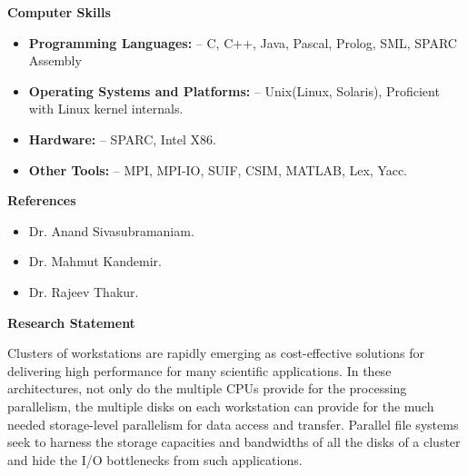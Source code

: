 \documentclass{article}
\begin{document}
  \vspace*{-0.1truein}
  \large \textbf{Computer Skills}
  \normalsize
  \vspace*{-0.2truein}
  \begin{center}
  \begin{itemize}
	\item {\textbf{Programming Languages:} -- C, C++, Java, Pascal, Prolog, SML, SPARC Assembly}
	\vspace*{-0.1truein}
	\item {\textbf{Operating Systems and Platforms:} -- Unix(Linux, Solaris), Proficient with Linux
	kernel internals.}
	\vspace*{-0.1truein}
	\item {\textbf{Hardware:} -- SPARC, Intel X86.} 
	\vspace*{-0.1truein}
	\item {\textbf{Other Tools:} -- MPI, MPI-IO, SUIF, CSIM, MATLAB, Lex, Yacc.}
  \end{itemize}
  \end{center}

    
  \vspace*{-0.1truein}
  \large \textbf{References}
  \vspace*{-0.2truein}
  \normalsize
  \begin{itemize}
  \item{Dr. Anand Sivasubramaniam.}
  \item{Dr. Mahmut Kandemir.}
  \item{Dr. Rajeev Thakur.}
  \end{itemize}

	\vspace*{-0.1truein}
	\large \textbf{Research Statement}
	\normalsize

Clusters of workstations are rapidly emerging as cost-effective solutions for 
delivering high performance for many scientific applications. In these 
architectures, not only do the multiple CPUs provide for the processing 
parallelism, the multiple disks on each workstation can provide for the much 
needed storage-level parallelism for data access and transfer. Parallel file 
systems seek to harness the storage capacities and bandwidths of all the disks of a cluster 
and hide the I/O bottlenecks from such applications. 
\end{document}

